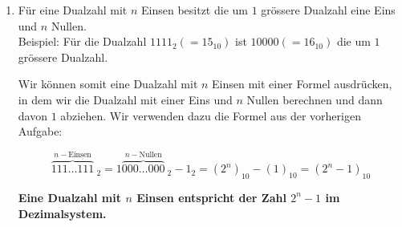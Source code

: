 \begin{enumerate}
\item Für eine Dualzahl mit $n$ Einsen besitzt die um $1$ grössere Dualzahl eine Eins und $n$ Nullen.\\

Beispiel: Für die Dualzahl $1111_2 (=15_{10})$ ist $10000 (=16_{10})$ die um $1$ grössere Dualzahl.

 Wir können somit eine Dualzahl mit $n$ Einsen mit einer Formel ausdrücken, in dem wir die Dualzahl mit einer Eins und $n$ Nullen berechnen und dann davon $1$ abziehen. Wir verwenden dazu die Formel aus der vorherigen Aufgabe:

\begin{equation*}
\overbrace{111\dots111}^{n-\textrm{Einsen}}~_2 = 1\overbrace{000\dots000}^{n-\textrm{Nullen}}~_2 - 1_2 = (2^n)_{10}-(1)_{10} = (2^n-1)_{10}
\end{equation*}

\textbf{Eine Dualzahl mit $n$ Einsen entspricht der Zahl $2^n-1$ im Dezimalsystem.}

\end{enumerate}